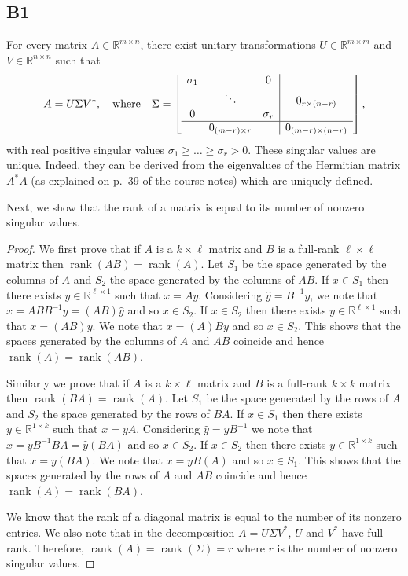 \documentclass[11pt]{article}
\DeclareMathOperator{\rank}{rank}
\newcommand{\real}{\mathbb{R}} %
\newcommand{\snorm}[1]{\norm{#1}_2} %
\begin{document}
\subsection*{B1}
For every matrix \(A \in \real^{m \times n}\), there exist unitary transformations \(U \in \real^{m \times m}\) and \(V \in \real^{n \times n}\) such that
\[
A = U \Sigma V^*, \quad \textnormal{where}\quad \Sigma = \left[\begin{array}{ccc|c}
\sigma_1 & & 0 & \\
& \ddots & & 0_{r \times (n-r)}\\
0 && \sigma_r & \\
\hline
& 0_{(m-r) \times r} & & 0_{(m-r) \times (n-r)}
\end{array}\right],
\]
with real positive singular values \(\sigma_1 \geqslant \dots \geqslant \sigma_r > 0\).
These singular values are unique. Indeed, they can be derived from the eigenvalues of the Hermitian matrix $A^*A$ (as explained on p.~39 of the course notes) which are uniquely defined.

Next, we show that the rank of a matrix is equal to its number of nonzero singular values.
\begin{proof}
	We first prove that if $A$ is a $k\times \ell$ matrix and $B$ is a full-rank $\ell \times \ell$ matrix then $\rank(AB)=\rank(A)$.
	Let $S_1$ be the space generated by the columns of $A$ and $S_2$ the space generated by the columns of $AB$.
	If $x\in S_1$ then there exists $y\in \real^{\ell \times 1}$ such that $x=Ay$.
	Considering $\hat{y}=B^{-1}y$, we note that $x=ABB^{-1}y=(AB)\hat{y}$ and so $x\in S_2$. If $x\in S_2$ then there exists $y\in \real^{\ell\times 1}$ such that $x=(AB)y$.
	We note that $x=(A)By$ and so $x\in S_2$. This shows that the spaces generated by the columns of $A$ and $AB$ coincide and hence $\rank(A)=\rank(AB)$.
	
	Similarly we prove that if $A$ is a $k \times \ell$ matrix and $B$ is a full-rank $k\times k$ matrix then $\rank(BA)=\rank(A)$.
	Let $S_1$ be the space generated by the rows of $A$ and $S_2$ the space generated by the rows of $BA$.
	If $x\in S_1$ then there exists $y\in \real^{1\times k}$ such that $x=yA$. Considering $\hat{y}=yB^{-1}$ we note that $x=yB^{-1}BA=\hat{y}(BA)$ and so $x\in S_2$. If $x\in S_2$ then there exists $y\in \real^{1\times k}$ such that $x=y(BA)$.
	We note that $x=yB(A)$ and so $x\in S_1$. This shows that the spaces generated by the rows of $A$ and $AB$ coincide and hence $\rank(A)=\rank(BA)$.
	
	We know that the rank of a diagonal matrix is equal to the number of its nonzero entries.
	We also note that in the decomposition \(A = U \Sigma V^*\), \(U\) and \(V^*\) have full rank.
	Therefore, \(\rank(A) = \rank(\Sigma) = r\) where $r$ is the number of nonzero singular values.
\end{proof}
\end{document}
